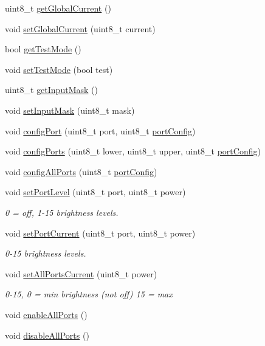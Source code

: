 \begin{DoxyCompactItemize}
\item 
uint8\-\_\-t \hyperlink{classMAX6956_a1926760b263588314fd759d129091940}{get\-Global\-Current} ()
\item 
void \hyperlink{classMAX6956_a4669dcc0f2f89f8fe73a0fa9b97dae21}{set\-Global\-Current} (uint8\-\_\-t current)
\item 
bool \hyperlink{classMAX6956_ad4f99f08d1cf08c5a0097215e680a80a}{get\-Test\-Mode} ()
\item 
void \hyperlink{classMAX6956_ad1b4e5cafd91acd2be2b6fb8197afef0}{set\-Test\-Mode} (bool test)
\item 
uint8\-\_\-t \hyperlink{classMAX6956_a56245915d7d4cd8fd34629bd91695147}{get\-Input\-Mask} ()
\item 
void \hyperlink{classMAX6956_a7ce45652fb0490af0ecb4eaebc230419}{set\-Input\-Mask} (uint8\-\_\-t mask)
\item 
void \hyperlink{classMAX6956_a5e05bead41c585c68de79bbfed971d19}{config\-Port} (uint8\-\_\-t port, uint8\-\_\-t \hyperlink{classMAX6956_a9799e7684546e3e9b24506d436586a09}{port\-Config})
\item 
void \hyperlink{classMAX6956_a400393e30fbe196aef43d8edea890228}{config\-Ports} (uint8\-\_\-t lower, uint8\-\_\-t upper, uint8\-\_\-t \hyperlink{classMAX6956_a9799e7684546e3e9b24506d436586a09}{port\-Config})
\item 
void \hyperlink{classMAX6956_a9e9f11c46bdc86d8e882ed8bb5efabdf}{config\-All\-Ports} (uint8\-\_\-t \hyperlink{classMAX6956_a9799e7684546e3e9b24506d436586a09}{port\-Config})
\item 
void \hyperlink{classMAX6956_a98fa3831a47355fe0856caa74a9cf810}{set\-Port\-Level} (uint8\-\_\-t port, uint8\-\_\-t power)
\begin{DoxyCompactList}\small\item\em 0 = off, 1-\/15 brightness levels. \end{DoxyCompactList}\item 
void \hyperlink{classMAX6956_a76a617f3b8982bb3855c5152b480097a}{set\-Port\-Current} (uint8\-\_\-t port, uint8\-\_\-t power)
\begin{DoxyCompactList}\small\item\em 0-\/15 brightness levels. \end{DoxyCompactList}\item 
void \hyperlink{classMAX6956_a9a27a32611fa05766946c33850510644}{set\-All\-Ports\-Current} (uint8\-\_\-t power)
\begin{DoxyCompactList}\small\item\em 0-\/15, 0 = min brightness (not off) 15 = max \end{DoxyCompactList}\item 
void \hyperlink{classMAX6956_a51a47c1f69532e96c6caa357889004e3}{enable\-All\-Ports} ()
\item 
void \hyperlink{classMAX6956_a93a81ff86316f63ee1ada3529da2a95b}{disable\-All\-Ports} ()
\end{DoxyCompactItemize}

